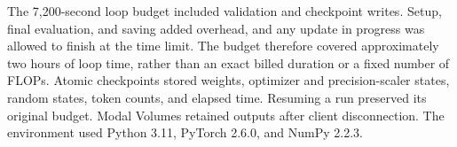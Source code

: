 The 7,200-second loop budget included validation and checkpoint writes. Setup, final evaluation, and saving added overhead, and any update in progress was allowed to finish at the time limit. The budget therefore covered approximately two hours of loop time, rather than an exact billed duration or a fixed number of FLOPs. Atomic checkpoints stored weights, optimizer and precision-scaler states, random states, token counts, and elapsed time. Resuming a run preserved its original budget. Modal Volumes retained outputs after client disconnection. The environment used Python 3.11, PyTorch 2.6.0, and NumPy 2.2.3.
